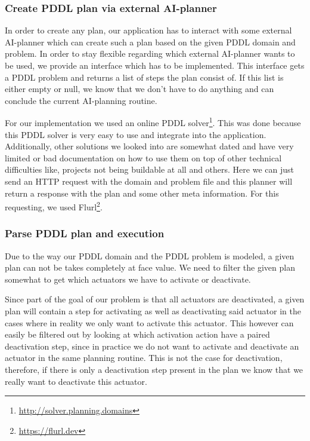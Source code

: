 \subsubsection{Create PDDL plan via external AI-planner}\label{subsubsec:create-pddl-plan-via-external-ai-planner}
In order to create any plan, our application has to interact with some external AI-planner which can create such a plan based on the given PDDL domain and problem.
In order to stay flexible regarding which external AI-planner wants to be used, we provide an interface which has to be implemented.
This interface gets a PDDL problem and returns a list of steps the plan consist of.
If this list is either empty or null, we know that we don't have to do anything and can conclude the current AI-planning routine.

For our implementation we used an online PDDL solver\footnote{\url{http://solver.planning.domains}}.
This was done because this PDDL solver is very easy to use and integrate into the application.
Additionally, other solutions we looked into are somewhat dated and have very limited or bad documentation on how to use them on top of other technical difficulties like, projects not being buildable at all and others.
Here we can just send an HTTP request with the domain and problem file and this planner will return a response with the plan and some other meta information.
For this requesting, we used Flurl\footnote{\url{https://flurl.dev}}.

\subsubsection{Parse PDDL plan and execution}\label{subsubsec:parse-pddl-plan-and-execution}
Due to the way our PDDL domain and the PDDL problem is modeled, a given plan can not be takes completely at face value.
We need to filter the given plan somewhat to get which actuators we have to activate or deactivate.

Since part of the goal of our problem is that all actuators are deactivated, a given plan will contain a step for activating as well as deactivating said actuator in the cases where in reality we only want to activate this actuator.
This however can easily be filtered out by looking at which activation action have a paired deactivation step, since in practice we do not want to activate and deactivate an actuator in the same planning routine.
This is not the case for deactivation, therefore, if there is only a deactivation step present in the plan we know that we really want to deactivate this actuator.

